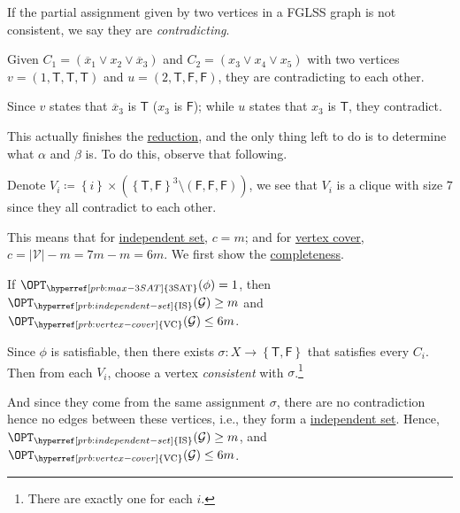 \begin{notation}[Contradiction]
	If the partial assignment given by two vertices in a FGLSS graph is not consistent, we say they are \emph{contradicting}.
\end{notation}
\begin{eg}
	Given \(C_1=(\overline{x}_1 \lor x_2 \lor \overline{x}_3)\) and \(C_2 = (x_3\lor x_4\lor x_5)\) with two vertices \(v=(1, \textsf{T}, \textsf{T}, \textsf{T})\) and \(u=(2, \textsf{T}, \textsf{F}, \textsf{F})\), they are contradicting to each other.
\end{eg}
\begin{explanation}
	Since \(v\) states that \(\overline{x}_3\) is \(\textsf{T}\) (\(x_3\) is \(\textsf{F}\)); while \(u\) states that \(x_3\) is \(\textsf{T}\), they contradict.
\end{explanation}

This actually finishes the \hyperref[def:reduction]{reduction}, and the only thing left to do is to determine what \(\alpha \) and \(\beta \) is. To do this, observe that following.
\begin{remark}
	Denote \(V_i \coloneqq \left\{ i \right\} \times \left( \left\{ \textsf{T}, \textsf{F} \right\} ^3 \setminus (\textsf{F}, \textsf{F}, \textsf{F}) \right)\), we see that \(V_i\) is a clique with size \(7\) since they all contradict to each other.
\end{remark}

This means that for \hyperref[prb:independent-set]{independent set}, \(c = m\); and for \hyperref[prb:vertex-cover]{vertex cover}, \(c = \vert \mathcal{V}  \vert - m = 7m - m = 6m\). We first show the \hyperref[def:completeness]{completeness}.

\begin{claim}
	If \(\OPT_{\hyperref[prb:max-3SAT]{\text{3SAT}}} (\phi) = 1\), then \(\OPT_{\hyperref[prb:independent-set]{\text{IS}} }(\mathcal{G} ) \geq m\) and \(\OPT_{\hyperref[prb:vertex-cover]{\text{VC}} }(\mathcal{G} ) \leq 6m\).
\end{claim}
\begin{explanation}
	Since \(\phi \) is satisfiable, then there exists \(\sigma \colon X \to \left\{ \textsf{T}, \textsf{F} \right\} \) that satisfies every \(C_i\). Then from each \(V_i\), choose a vertex \emph{consistent} with \(\sigma \).\footnote{There are exactly one for each \(i\).}

	And since they come from the same assignment \(\sigma \), there are no contradiction hence no edges between these vertices, i.e., they form a \hyperref[prb:independent-set]{independent set}. Hence, \(\OPT_{\hyperref[prb:independent-set]{\text{IS}} }(\mathcal{G} ) \geq m\), and \(\OPT_{\hyperref[prb:vertex-cover]{\text{VC}} }(\mathcal{G} ) \leq 6m\).
\end{explanation}

